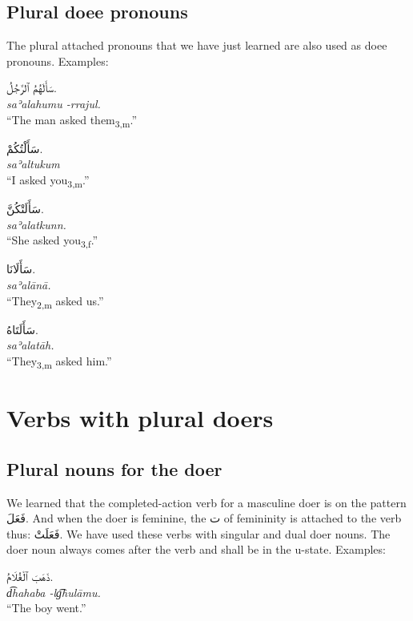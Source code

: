\documentclass[
  10pt,
]{book}
\begin{document}
\subsection{Plural doee pronouns}\label{plural-doee-pronouns}

The plural attached pronouns that we have just learned are also used as doee pronouns.
Examples:

\foreignlanguage{arabic}{سَأَلَهُمُ ٱلرَّجُلُ.}\\
\emph{saʾalahumu -rrajul.}\\
\enquote{The man asked them\textsubscript{3,m}.}

\foreignlanguage{arabic}{سَأَلْتُکُمْ.}\\
\emph{saʾaltukum}\\
\enquote{I asked you\textsubscript{3,m}.}

\foreignlanguage{arabic}{سَأَلَتْکُنَّ.}\\
\emph{saʾalatkunn.}\\
\enquote{She asked you\textsubscript{3,f}.}

\foreignlanguage{arabic}{سَأَلَانَا.}\\
\emph{saʾalānā.}\\
\enquote{They\textsubscript{2,m} asked us.}

\foreignlanguage{arabic}{سَأَلَتَاهُ.}\\
\emph{saʾalatāh.}\\
\enquote{They\textsubscript{3,m} asked him.}

\section{Verbs with plural doers}\label{verbs-with-plural-doers}

\subsection{Plural nouns for the doer}\label{plural-nouns-for-the-doer}

We learned that the completed-action verb for a masculine doer is on the pattern \foreignlanguage{arabic}{فَعَلَ}. And when the doer is feminine, the \foreignlanguage{arabic}{ت} of femininity is attached to the verb thus: \foreignlanguage{arabic}{فَعَلَتْ}. We have used these verbs with singular and dual doer nouns. The doer noun always comes after the verb and shall be in the u-state. Examples:

\foreignlanguage{arabic}{ذَهَبَ ٱلْغُلَامُ.}\\
\emph{d͡hahaba -lg͡hulāmu.}\\
\enquote{The boy went.}
\end{document}
